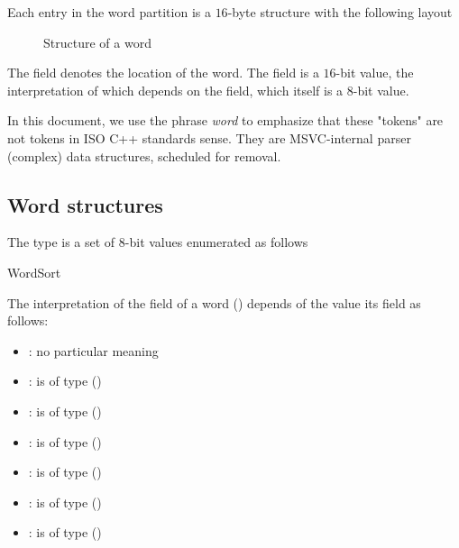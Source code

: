 Each entry in the word partition is a $16$-byte structure with the following layout
%
\begin{figure}[H]
	\centering
	\caption{Structure of a word}
	\label{fig:ifc-word-structure}
\end{figure}
%
The  field denotes the location of the word.
The  field is a $16$-bit value, the interpretation of which depends
on the  field, which itself is a $8$-bit value.  

In this document, we use the phrase \emph{word} to emphasize that these "tokens" are not tokens in ISO C++ standards sense.
They are MSVC-internal parser (complex) data structures, scheduled for removal.


\subsection{Word structures}
\label{sec:ifc:word-structures}

The type  is a set of 8-bit values enumerated as follows
\begin{Enumeration}{WordSort}
\end{Enumeration}

The interpretation of the  field of a 
word ()
depends of the value its  field as follows:
\begin{itemize}
	\item {}: no particular meaning
	\item {}:  is of type
		 ()
	\item {}:  is of type 
	 ()
	\item {}:  is of type
	   ()
	\item {}:  is of type
	    ()
	\item {}:  is of type
		 ()
	\item {}:  is of type
	     ()
\end{itemize}

